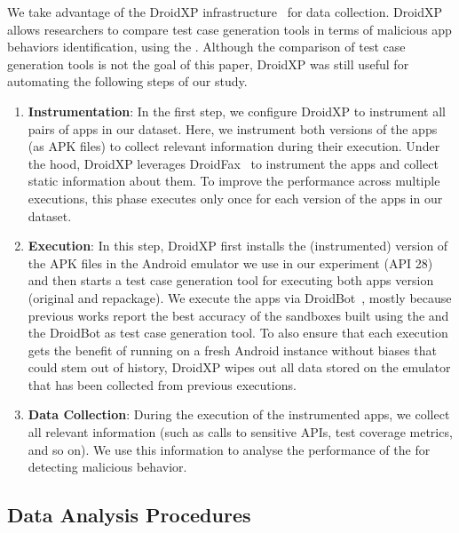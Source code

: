 We take advantage of the DroidXP infrastructure~\cite{DBLP:conf/scam/CostaMCMVBC20}
for data collection. DroidXP allows researchers to compare 
test case generation tools in terms of malicious app behaviors identification, using the \mas. Although the comparison of test
case generation tools is not the goal of this paper, DroidXP
was still useful for automating the following steps of our study.


\begin{enumerate}[S1]
 \item \textbf{Instrumentation}: In the first step,
we configure DroidXP to instrument all pairs of apps in our dataset.
Here, we instrument both versions of the apps (as APK files) to collect relevant information during their execution. Under the hood, DroidXP leverages
DroidFax~\cite{DBLP:conf/icsm/CaiR17a} to instrument the apps and collect static
information about them. To improve the performance across multiple executions,
this phase executes only once for each version of the apps in our dataset.

\item \textbf{Execution}: In this step, DroidXP first installs the (instrumented) version of the APK files in the Android emulator we use in our experiment (API 28) and then starts a test case generation tool for executing both apps version (original and repackage). We execute the apps via DroidBot~\cite{DBLP:conf/icse/LiYGC17}, mostly because previous works report the best accuracy of the sandboxes built using the \mas and the DroidBot as test case generation tool. To also ensure that each execution gets the benefit of running on a fresh Android instance without biases that could stem out of history, DroidXP wipes out all data stored on the emulator that has been collected from previous executions.


\item \textbf{Data Collection}: During the execution of the instrumented apps, we collect all relevant information (such as calls to sensitive APIs, test coverage metrics, and so on). We use this information to analyse the performance of the \mas for detecting malicious behavior.
\end{enumerate}

\subsection{Data Analysis Procedures} \label{sec:dataAnalysisProc}



